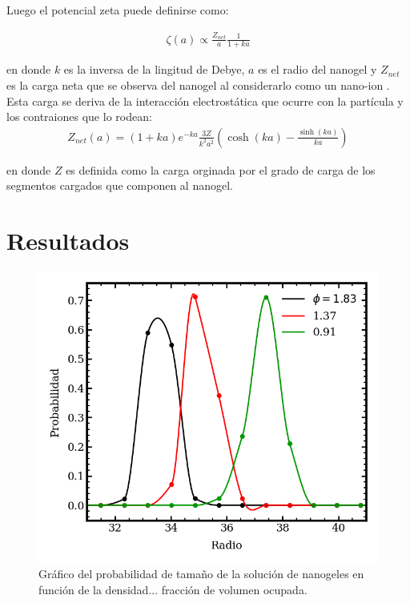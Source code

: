 Luego el potencial zeta puede definirse como: \addcite[libro S\&C]

\begin{align}
	\zeta (a) \propto \frac{Z_{net}}{a} \frac{1}{1 +ka}
	\label{eq:mc:potzeta}
\end{align}


\noindent en donde  $k$ es la inversa de la lingitud de Debye, $a$ es el radio del nanogel y $Z_{net}$ es la carga neta que se observa del nanogel al considerarlo como un nano-ion \addcite[Denton 2003]. Esta carga se deriva de la interacci\'on electrost\'atica que ocurre con la part\'icula y los contraiones que lo rodean:
\begin{align}
	Z_{net}(a) = (1 + ka)e^{-ka} \frac{3Z}{k^2a^2}\left(\cosh(ka) - \frac{\sinh(ka)}{ka}\right)
	\label{eq:mc:znet}
\end{align}

\noindent en donde $Z$ es definida como la carga orginada por el grado de carga de los segmentos cargados que componen al nanogel.

\section{Resultados}

\begin{figure}[!tb]
	\centering
	\includegraphics[width=1\linewidth]{Figures/graph-mc/sizes.png}
	\caption{Gr\'afico del probabilidad de tama\~no de la soluci\'on de  nanogeles en funci\'on de la densidad... fracci\'on de volumen ocupada.}
	\label{fig:mc:sizes-phi}
\end{figure}



